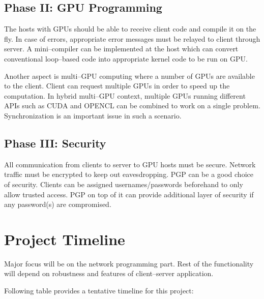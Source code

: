 \documentclass{article}
\begin{document}
\subsection{Phase II: GPU Programming}
The hosts with GPUs should be able to receive client code and compile it on the fly. In case of errors, appropriate error messages must be relayed to client through server. A mini--compiler can be implemented at the host which can convert conventional loop--based code into appropriate kernel code to be run on GPU. 

Another aspect is multi--GPU computing where a number of GPUs are available to the client. Client can request multiple GPUs in order to speed up the computation. In hybrid multi--GPU context, multiple GPUs running different APIs such as CUDA and OPENCL can be combined to work on a single problem. Synchronization is an important issue in such a scenario.

\subsection{Phase III: Security}
All communication from clients to server to GPU hosts must be secure. Network traffic must be encrypted to keep out eavesdropping. PGP can be a good choice of security. Clients can be assigned usernames/passwords beforehand to only allow trusted access. PGP on top of it can provide additional layer of security if any password(s) are compromised.

\section{Project Timeline}

Major focus will be on the network programming part. Rest of the functionality will depend on robustness and features of client--server application.

Following table provides a tentative timeline for this project:
\end{document}

